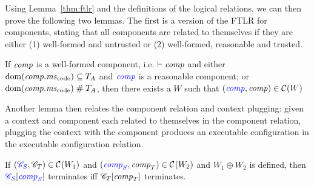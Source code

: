 \documentclass[acmsmall,review,showframe]{acmart}\settopmatter{printfolios=true,printccs=false,printacmref=false}
\renewcommand{\npair}[2][n]{#2}
\renewcommand{\nonExec}[1]{\plainfun{nonExec}{#1}}
\renewcommand{\comp}{\var{comp}}
\renewcommand{\lrexj}[1][]{\typesetlr{E}^{#1}_{\mathrm{xjmp}}}
\renewcommand{\lrrg}[2][]{\typesetlr{R}^{#1}_{#2}}
\renewcommand{\lrr}[1][]{\lrrg[#1]{\untrusted}}
\renewcommand{\lrcomp}[1][]{\typesetlr{C}^{#1}}
\renewcommand{\lrec}[1][]{\typesetlr{EC}^{#1}}
\renewcommand{\memSat}[3][]{\memSatGeneric{#1}{#2}{#3}{}}
\newcommand{\wdjud}[2][ ]{#1 \vdash #2}
\newcommand{\trgcm}{\textsc{LCM}}
\newcommand{\srccm}{\textsc{oLCM}}
\begin{document}
Using Lemma~\ref{thm:ftlr} and the definitions of the logical relations, we can then prove the following two lemmas.
The first is a version of the FTLR for components, stating that all components are related to themselves if they are either (1) well-formed and untrusted or (2) well-formed, reasonable and trusted.
\begin{lemma}
  \label{lem:ftlr-comps}
  If $\comp$ is a well-formed component, i.e. $\wdjud{\comp}$ and either
    $\dom(\comp.\mscode) \subseteq \ta$ and $\src{\comp}$ is a reasonable component; or
    $\dom(\comp.\mscode) \mathrel{\#} \ta$,
  then there exists a $W$ such that
  $\npair{(\src{\comp},\comp)} \in \lrcomp(W)$
\end{lemma}

Another lemma then relates the component relation and context plugging: given a context and component each related to themselves in the component relation, plugging the context with the component produces an executable configuration in the executable configuration relation.
\begin{lemma}
  \label{lem:adeq-context-plug}
  If $\npair{\stpair{\context}{\context}}\in\lrcomp(W_1)$ and $\npair{\stpair{\comp}{\comp}} \in \lrcomp(W_2)$ and $W_1\oplus W_2$ is defined, then
  $\plug{\src{\context_S}}{\src{\comp_S}}$ terminates iff $\plug{\context_T}{\comp_T}$ terminates.
\end{lemma}
\end{document}
